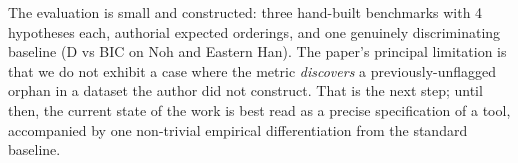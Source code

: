 \documentclass{article}
\begin{document}
The evaluation is small and constructed: three hand-built benchmarks
with 4 hypotheses each, authorial expected orderings, and one genuinely
discriminating baseline (D vs BIC on Noh and Eastern Han). The
paper's principal limitation is that we do not exhibit a case where
the metric \emph{discovers} a previously-unflagged orphan in a
dataset the author did not construct. That is the next step; until
then, the current state of the work is best read as a precise
specification of a tool, accompanied by one non-trivial empirical
differentiation from the standard baseline.



\end{document}
